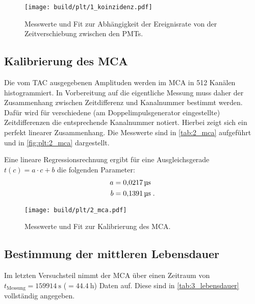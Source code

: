 \begin{table}
    \centering
    \caption{Messwerte zur Abhängigkeit der Ereignisrate von der Zeitverschiebung zwischen den \acp{PMT}.}
    \label{tab:1_koinzidenz}
\end{table}

\begin{figure}
    \centering
    \texttt{[image: build/plt/1\_koinzidenz.pdf]}
    \caption{Messwerte und Fit zur Abhängigkeit der Ereignisrate von der Zeitverschiebung zwischen den \acp{PMT}.}
    \label{fig:plt:1_koinzidenz}
\end{figure}


\FloatBarrier
\subsection{Kalibrierung des \acs{MCA}} \label{sec:auswertung:mca}
Die vom \ac{TAC} ausgegebenen Amplituden werden im \ac{MCA} in \num{512} Kanälen histogrammiert.
In Vorbereitung auf die eigentliche Messung muss daher
der Zusammenhang zwischen Zeitdifferenz und Kanalnummer bestimmt werden.
Dafür wird für verschiedene (am Doppelimpulsgenerator eingestellte) Zeitdifferenzen
die entsprechende Kanalnummer notiert.
Hierbei zeigt sich ein perfekt linearer Zusammenhang.
Die Messwerte sind in \autoref{tab:2_mca} aufgeführt und in \autoref{fig:plt:2_mca} dargestellt.

Eine lineare Regressionsrechnung ergibt
für eine Ausgleichsgerade $t(c) = a \cdot c + b$
die folgenden Parameter:
\begin{align*}
    a &=\SI{0.0217 \pm 0}{\micro\second} \\
    b &=\SI{0.1391 \pm 0}{\micro\second} \; .
\end{align*}

\begin{table}
    \centering
    \caption{Messwerte zur Kalibrierung des \ac{MCA}.}
    \label{tab:2_mca}
\end{table}

\begin{figure}
    \centering
    \texttt{[image: build/plt/2\_mca.pdf]}
    \caption{Messwerte und Fit zur Kalibrierung des \ac{MCA}.}
    \label{fig:plt:2_mca}
\end{figure}


\FloatBarrier
\subsection{Bestimmung der mittleren Lebensdauer} \label{sec:auswertung:lebensdauer}
Im letzten Versuchsteil nimmt der \ac{MCA} über einen Zeitraum von $t_\text{Messung} = \SI{159914}{\second}$ ($= \SI{44.4}{\hour}$) Daten auf.
Diese sind in \autoref{tab:3_lebensdauer} vollständig angegeben.


